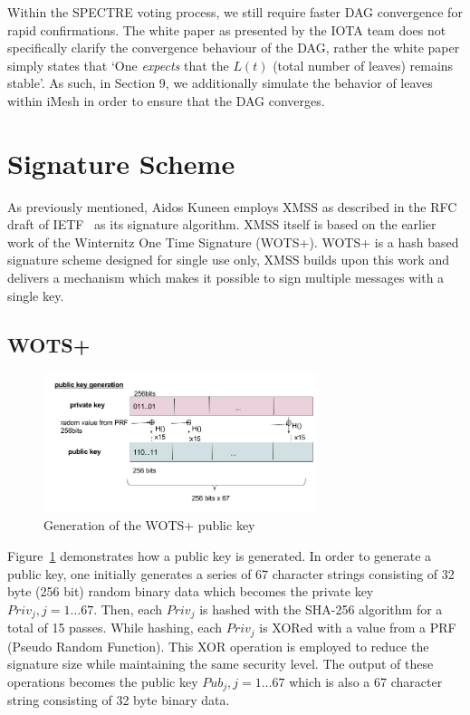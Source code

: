 \documentclass[a4paper,10pt,twocolumn]{article}
\begin{document}
	\vspace{2.5mm}
	
	Within the SPECTRE voting process, we still require faster DAG convergence for rapid confirmations. The white paper as presented by the 
	IOTA team does not specifically clarify the convergence behaviour of the DAG, rather the white paper simply states that `One 
	\emph{expects} that the \( L(t) \) (total number of leaves) remains stable'. As such, in Section 9, we additionally simulate the behavior of leaves within iMesh in order to ensure that the DAG converges.
	
	\section{Signature Scheme}
	\label{sec:sig}
	
	As previously mentioned, Aidos Kuneen employs XMSS as described in the RFC draft of IETF~\cite{ietf} as its signature algorithm. XMSS 
	itself is based on the earlier work of the Winternitz One Time Signature (WOTS+). WOTS+ is a hash based signature scheme designed for 
	single use only, XMSS builds upon this work and delivers a mechanism which makes it possible to sign multiple messages with a single 
	key.
	
	\subsection{WOTS+}
	
	\begin{figure}[ht]
		\begin{center}
		\includegraphics[width=80mm]{wots_pub.png}
		  \caption{Generation of the WOTS+ public key}
		\label{fig:wots_pub}
		\end{center}
	 \end{figure}
	
	\vspace{-3.5mm}
	
	 Figure~\ref{fig:wots_pub} demonstrates how a public key is generated. In order to generate a public key, one initially generates a series of 67 character strings consisting of 32 byte (256 bit) random binary data which becomes the 
	 private key \( Priv_{j}, j=1 \ldots 67\). Then, each \( Priv_{j} \) is hashed with the SHA-256 algorithm for a total of 15 passes. 
	 While hashing, each \( Priv_{j} \) is XORed with a value from a PRF (Pseudo Random Function). This XOR operation is employed to reduce 
	 the signature size while maintaining the same security level. The output of these operations becomes the public 
	 key \( Pub_{j}, j=1 \ldots 67\) which is also a 67 character string consisting of 32 byte binary data.
	
\end{document}
